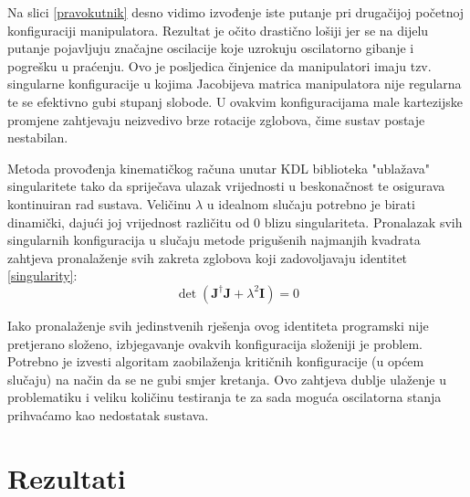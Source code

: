 \documentclass[times, utf8, diplomski, numeric]{fer}
\begin{document}

Na slici \ref{pravokutnik} desno vidimo izvođenje iste putanje pri drugačijoj početnoj konfiguraciji manipulatora.
Rezultat je očito drastično lošiji jer se na dijelu putanje pojavljuju značajne oscilacije koje uzrokuju oscilatorno gibanje i pogrešku u praćenju.
Ovo je posljedica činjenice da manipulatori imaju tzv. singularne konfiguracije u kojima Jacobijeva matrica manipulatora nije regularna te se efektivno gubi stupanj slobode.
U ovakvim konfiguracijama male kartezijske promjene zahtjevaju neizvedivo brze rotacije zglobova, čime sustav postaje nestabilan.

Metoda provođenja kinematičkog računa unutar KDL biblioteka "ublažava" singularitete tako da spriječava ulazak vrijednosti u beskonačnost te osigurava kontinuiran rad sustava.
Veličinu $\lambda$ u idealnom slučaju potrebno je birati dinamički, dajući joj vrijednost različitu od $0$ blizu singulariteta.
Pronalazak svih singularnih konfiguracija u slučaju metode prigušenih najmanjih kvadrata zahtjeva pronalaženje svih zakreta zglobova koji zadovoljavaju identitet \ref{singularity}:
\begin{equation}
\det \left(\mathbf{J}^{\dagger} \mathbf{J} + \lambda^2\mathbf{I}\right) =0
\label{singularity}
\end{equation}

Iako pronalaženje svih jedinstvenih rješenja ovog identiteta programski nije pretjerano složeno, izbjegavanje ovakvih konfiguracija složeniji je problem.
Potrebno je izvesti algoritam zaobilaženja kritičnih konfiguracije (u općem slučaju) na način da se ne gubi smjer kretanja.
Ovo zahtjeva dublje ulaženje u problematiku i veliku količinu testiranja te za sada moguća oscilatorna stanja prihvaćamo kao nedostatak sustava.


\chapter{Rezultati}
\end{document}
